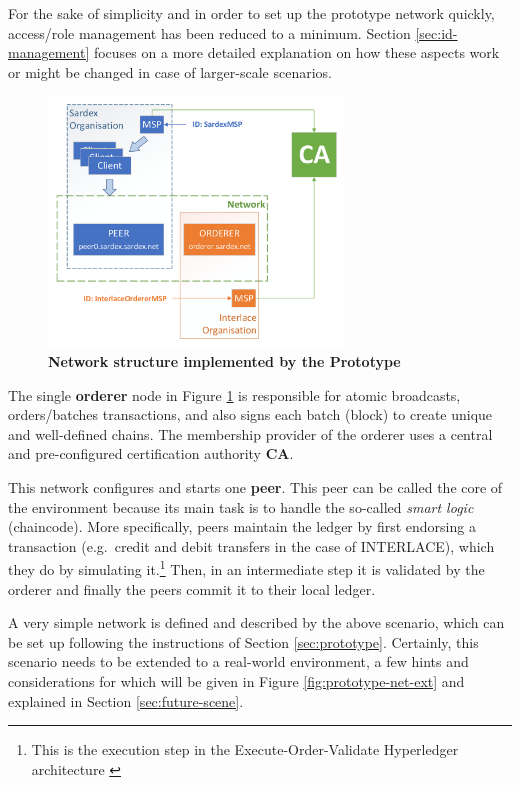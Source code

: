For the sake of simplicity and in order to set up the prototype network quickly, access/role management has been reduced to a minimum. Section \ref{sec:id-management} focuses on a more detailed explanation on how these aspects work or might be changed in case of larger-scale scenarios.  

\begin{figure}[htbp]
  \centering
  \includegraphics[width=0.7\textwidth, clip, trim=1mm 1mm 1mm 1mm]{Figures/basic-network}
  \caption{\bf\small Network structure implemented by the Prototype}
  \label{fig:prototype-net}
\end{figure}

The single \textbf{orderer} node in Figure \ref{fig:prototype-net} is responsible for atomic broadcasts, orders/batches transactions, and also signs each batch (block) to create unique and well-defined chains. The membership provider of the orderer uses a central and pre-configured certification authority \textbf{CA}.

This network configures and starts one \textbf{peer}. This peer can be called the core of the environment because its main task is to handle the so-called \textit{smart logic} (chaincode). More specifically, peers maintain the ledger by first endorsing a transaction (e.g.\ credit and debit transfers in the case of INTERLACE), which they do by simulating it.\footnote{This is the execution step in the Execute-Order-Validate Hyperledger architecture \cite{AndroulakiEtAl2018}} Then, in an intermediate step it is validated by the orderer and finally the peers commit it to their local ledger.

A very simple network is defined and described by the above scenario, which can be set up following the instructions of Section \ref{sec:prototype}. Certainly, this scenario needs to be extended to a real-world environment, a few hints and considerations for which will be given in Figure \ref{fig:prototype-net-ext} and explained in Section \ref{sec:future-scene}.

